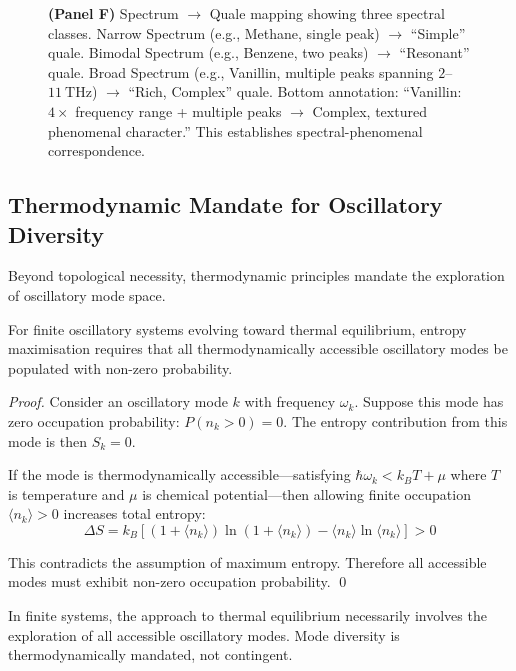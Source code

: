 \begin{figure}[htbp]
{    \textbf{(Panel F)} Spectrum $\rightarrow$ Quale mapping showing three spectral classes. Narrow Spectrum (e.g., Methane, single peak) $\rightarrow$ ``Simple'' quale. Bimodal Spectrum (e.g., Benzene, two peaks) $\rightarrow$ ``Resonant'' quale. Broad Spectrum (e.g., Vanillin, multiple peaks spanning $2$--$11~\text{THz}$) $\rightarrow$ ``Rich, Complex'' quale. Bottom annotation: ``Vanillin: $4\times$ frequency range + multiple peaks $\rightarrow$ Complex, textured phenomenal character.'' This establishes spectral-phenomenal correspondence.
    }
    \label{fig:vibrational_landscape}
    \end{figure}


\subsection{Thermodynamic Mandate for Oscillatory Diversity}

Beyond topological necessity, thermodynamic principles mandate the exploration of oscillatory mode space.

\begin{theorem}
\label{thm:mode_completeness}
For finite oscillatory systems evolving toward thermal equilibrium, entropy maximisation requires that all thermodynamically accessible oscillatory modes be populated with non-zero probability.
\end{theorem}

\begin{proof}
Consider an oscillatory mode $k$ with frequency $\omega_k$. Suppose this mode has zero occupation probability: $P(n_k > 0) = 0$. The entropy contribution from this mode is then $S_k = 0$.

If the mode is thermodynamically accessible—satisfying $\hbar\omega_k < k_B T + \mu$ where $T$ is temperature and $\mu$ is chemical potential—then allowing finite occupation $\langle n_k\rangle > 0$ increases total entropy:
$$\Delta S = k_B[(1 + \langle n_k\rangle)\ln(1 + \langle n_k\rangle) - \langle n_k\rangle\ln\langle n_k\rangle] > 0$$

This contradicts the assumption of maximum entropy. Therefore all accessible modes must exhibit non-zero occupation probability. \qed
\end{proof}

\begin{corollary}
In finite systems, the approach to thermal equilibrium necessarily involves the exploration of all accessible oscillatory modes. Mode diversity is thermodynamically mandated, not contingent.
\end{corollary}

